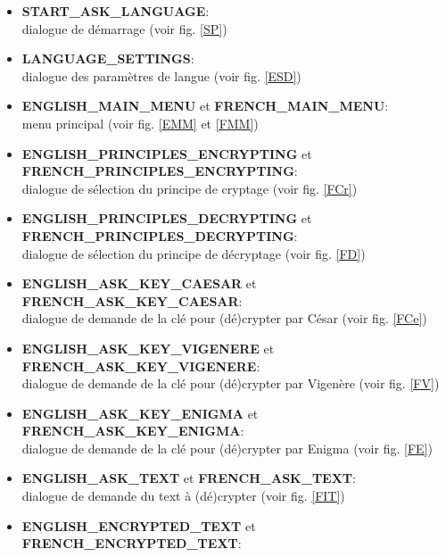 \documentclass[a4paper,12pt,abstracton,titlepage]{scrartcl}
\begin{document}
\begin{itemize}
\item \textbf{START\_ASK\_LANGUAGE}:\\
dialogue de démarrage (voir fig. \ref{SP})\\
\item \textbf{LANGUAGE\_SETTINGS}:\\
dialogue des paramètres de langue (voir fig. \ref{ESD})\\
\item \textbf{ENGLISH\_MAIN\_MENU} et \textbf{FRENCH\_MAIN\_MENU}:\\
menu principal (voir fig. \ref{EMM} et \ref{FMM})\\
\item \textbf{ENGLISH\_PRINCIPLES\_ENCRYPTING} et\\
\textbf{FRENCH\_PRINCIPLES\_ENCRYPTING}:\\
dialogue de sélection du principe de cryptage (voir fig. \ref{FCr})\\
\item \textbf{ENGLISH\_PRINCIPLES\_DECRYPTING} et\\
\textbf{FRENCH\_PRINCIPLES\_DECRYPTING}:\\
dialogue de sélection du principe de décryptage (voir fig. \ref{FD})\\
\item \textbf{ENGLISH\_ASK\_KEY\_CAESAR} et \textbf{FRENCH\_ASK\_KEY\_CAESAR}:\\
dialogue de demande de la clé pour (dé)crypter par César (voir fig. \ref{FCe})\\
\item \textbf{ENGLISH\_ASK\_KEY\_VIGENERE} et \textbf{FRENCH\_ASK\_KEY\_VIGENERE}:\\
dialogue de demande de la clé pour (dé)crypter par Vigenère (voir fig. \ref{FV})\\
\item \textbf{ENGLISH\_ASK\_KEY\_ENIGMA} et \textbf{FRENCH\_ASK\_KEY\_ENIGMA}:\\
dialogue de demande de la clé pour (dé)crypter par Enigma (voir fig. \ref{FE})\\
\item \textbf{ENGLISH\_ASK\_TEXT} et \textbf{FRENCH\_ASK\_TEXT}:\\
dialogue de demande du text à (dé)crypter (voir fig. \ref{FIT})\\
\item \textbf{ENGLISH\_ENCRYPTED\_TEXT} et \textbf{FRENCH\_ENCRYPTED\_TEXT}:\\

\end{itemize}
\end{document}
